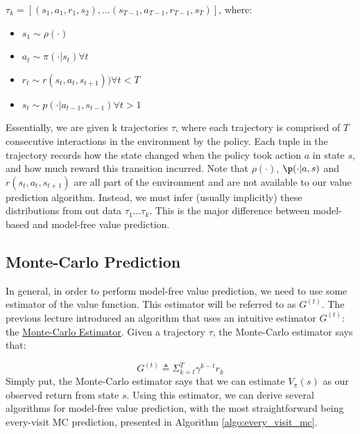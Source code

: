 \documentclass[11pt]{article}
\begin{document}
$\tau_k = [(s_1, a_1, r_1, s_2), \hdots (s_{T-1}, a_{T-1}, r_{T-1}, s_T)]$, where:
\begin{itemize}
    \item $s_1 \sim \rho(\cdot)$
    \item $a_t \sim \pi(\cdot|s_t) \forall t$
    \item $r_t \sim r(s_t, a_t, s_{t+1})) \forall t < T$
    \item $s_t \sim p(\cdot | a_{t-1}, s_{t-1}) \forall t > 1$
\end{itemize}
Essentially, we are given k trajectories $\tau$, where each trajectory is comprised of $T$ consecutive interactions in the environment by the policy. Each tuple in the trajectory records how the state changed when the policy took action $a$ in state $s$, and how much reward this transition incurred. Note that $\rho(\cdot)$, $\p(\cdot|a, s)$ and $r(s_t, a_t, s_{t+1})$ are all part of the environment and are not available to our value prediction algorithm. Instead, we must infer (usually implicitly) these distributions from out data $\tau_1 \hdots \tau_k$. This is the major difference between model-based and model-free value prediction.

\subsection{Monte-Carlo Prediction}
In general, in order to perform model-free value prediction, we need to use some estimator of the value function. This estimator will be referred to as $G^{(t)}$. The previous lecture introduced an algorithm that uses an intuitive estimator $G^{(t)}$: the \underline{Monte-Carlo Estimator}. Given a trajectory $\tau$, the Monte-Carlo estimator says that:

\begin{equation}
    G^{(t)} \triangleq \Sigma_{k=t}^{T} \gamma^{k-t} r_k
\end{equation}
Simply put, the Monte-Carlo estimator says that we can estimate $V_\pi(s)$ as our observed return from state $s$. Using this estimator, we can derive several algorithms for model-free value prediction, with the most straightforward being every-visit MC prediction, presented in Algorithm \ref{algo:every_visit_mc}. 
\end{document}
